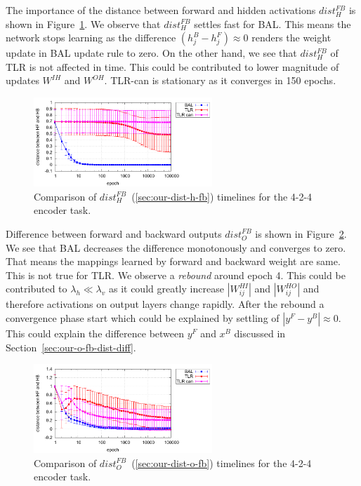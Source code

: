 The importance of the distance between forward and hidden activations $dist_{H}^{FB}$ is shown in Figure~\ref{fig:results-candidates-h-fb-d}. We observe that $dist_{H}^{FB}$ settles fast for BAL. This means the network stops learning as the difference $(h^B_j - h^F_j) \approx 0$ renders the weight update in BAL update rule to zero. On the other hand, we see that $dist_{H}^{FB}$ of TLR is not affected in time. This could be contributed to lower magnitude of updates $W^{IH}$ and $W^{OH}$. TLR-can is stationary as it converges in 150 epochs. 

\begin{figure}[H]
  \centering
  \includegraphics[width=0.6\textwidth]{img/feature-cmp-h-fb-d.pdf}  
   \caption{Comparison of $dist_{H}^{FB}$~(\ref{sec:our-dist-h-fb}) timelines for the {4-2-4 encoder} task.}
  \label{fig:results-candidates-h-fb-d}
\end{figure}

Difference between forward and backward outputs $dist_{O}^{FB}$ is shown in Figure~\ref{fig:results-candidates-o-fb-d}. We see that BAL decreases the difference monotonously and converges to zero. That means the mappings learned by forward and backward weight are same. This is not true for TLR. We observe a \emph{rebound} around epoch 4. This could be contributed to $\lambda_h \ll \lambda_v$ as it could greatly increase $|W^{HI}_{ij}|$ and $|W^{HO}_{ij}|$ and therefore activations on output layers change rapidly. After the rebound a convergence phase start which could be explained by settling of $|y^{F} - y^{B}| \approx 0$. This could explain the difference between $y^{F}$ and $x^B$ discussed in Section~\ref{sec:our-o-fb-dist-diff}. 

\begin{figure}[H]
  \centering
  \includegraphics[width=0.6\textwidth]{img/feature-cmp-o-fb-d.pdf}  
   \caption{Comparison of $dist_{O}^{FB}$~(\ref{sec:our-dist-o-fb}) timelines for the {4-2-4 encoder} task.}
  \label{fig:results-candidates-o-fb-d}
\end{figure}

